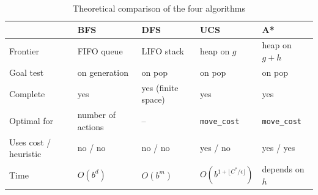 \begin{table}[H]
\centering
\caption{Theoretical comparison of the four algorithms}
\label{tab:theory}
\begin{tabularx}{\linewidth}{lXXXX}
\toprule
 & \textbf{BFS} & \textbf{DFS} & \textbf{UCS} & \textbf{A*} \\
\midrule
Frontier & FIFO queue & LIFO stack & heap on $g$ & heap on $g+h$ \\
Goal test & on generation & on pop & on pop & on pop \\
Complete & yes & yes (finite space) & yes & yes \\
Optimal for & number of actions & -- & \texttt{move\_cost} & \texttt{move\_cost} \\
Uses cost / heuristic & no / no & no / no & yes / no & yes / yes \\
Time & $O(b^d)$ & $O(b^m)$ & $O(b^{1+\lfloor C^*/\epsilon \rfloor})$ & depends on $h$ \\
\bottomrule
\end{tabularx}
\end{table}
